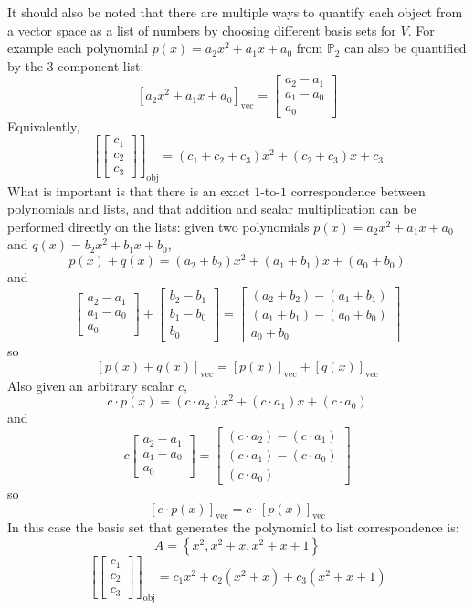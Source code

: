 \documentclass{article}
\begin{document}
It should also be noted that there are multiple ways to quantify each object from a vector space as a list of numbers by choosing different basis sets for \(V\). For example each polynomial \(p(x) = a_2 x^2 + a_1 x + a_0\) from \(\mathbb{P}_2\) can also be quantified by the \(3\) component list: 
\[[a_2 x^2 + a_1 x + a_0]_{\text{vec}} = \begin{bmatrix} a_2 - a_1 \\ a_1 - a_0 \\ a_0 \end{bmatrix}\] 
Equivalently, 
\[\left[\begin{bmatrix} c_1 \\ c_2 \\ c_3 \end{bmatrix}\right]_{\text{obj}} = (c_1 + c_2 + c_3)x^2 + (c_2 + c_3)x + c_3\]
What is important is that there is an exact \(1\)-to-\(1\) correspondence between polynomials and lists, and that addition and scalar multiplication can be performed directly on the lists: given two polynomials \(p(x) = a_2 x^2 + a_1 x + a_0\) and \(q(x) = b_2 x^2 + b_1 x + b_0\),
\[p(x) + q(x) = (a_2 + b_2)x^2 + (a_1 + b_1)x + (a_0 + b_0)\]
and
\[\begin{bmatrix} a_2 - a_1 \\ a_1 - a_0 \\ a_0 \end{bmatrix} + \begin{bmatrix} b_2 - b_1 \\ b_1 - b_0 \\ b_0 \end{bmatrix} = \begin{bmatrix} (a_2 + b_2) - (a_1 + b_1) \\ (a_1 + b_1) - (a_0 + b_0) \\ a_0 + b_0 \end{bmatrix}\] 
so 
\[[p(x) + q(x)]_{\text{vec}} = [p(x)]_{\text{vec}} + [q(x)]_{\text{vec}}\]
Also given an arbitrary scalar \(c\), 
\[c \cdot p(x) = (c \cdot a_2)x^2 + (c \cdot a_1)x + (c \cdot a_0)\]
and
\[c\begin{bmatrix} a_2 - a_1 \\ a_1 - a_0 \\ a_0 \end{bmatrix} = \begin{bmatrix} (c \cdot a_2) - (c \cdot a_1) \\ (c \cdot a_1) - (c \cdot a_0) \\ (c \cdot a_0) \end{bmatrix}\] 
so 
\[[c \cdot p(x)]_{\text{vec}} = c \cdot [p(x)]_{\text{vec}}\]
In this case the basis set that generates the polynomial to list correspondence is: 
\[A = \left\{x^2 , x^2 + x, x^2 + x + 1\right\}\]
\[\left[\begin{bmatrix} c_1 \\ c_2 \\ c_3 \end{bmatrix}\right]_{\text{obj}} = c_1 x^2 + c_2(x^2 + x) + c_3(x^2 + x + 1)\]
\end{document}
